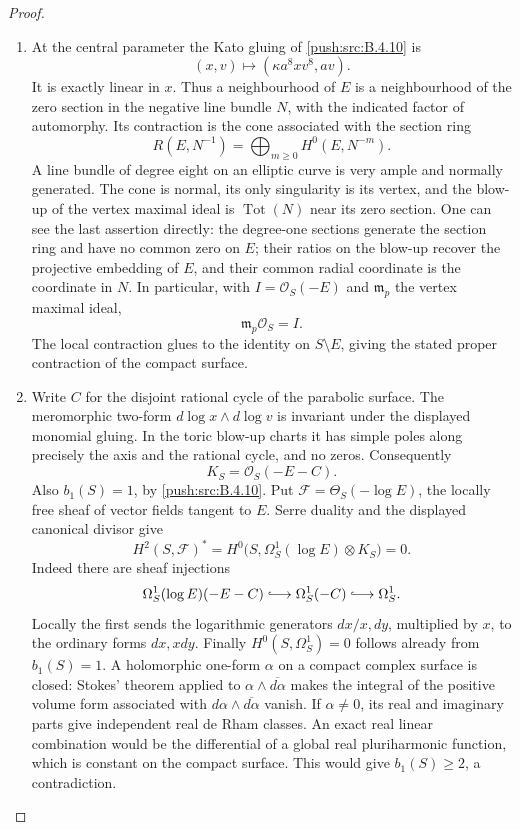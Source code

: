 \begin{proof}
\begin{enumerate}[label=\arabic*.,leftmargin=*]
\item At the central parameter the Kato gluing of \ref{push:src:B.4.10} is
\[
 (x,v)\longmapsto(\kappa a^8xv^8,av).
\]
It is exactly linear in $x$.  Thus a neighbourhood of $E$ is a
neighbourhood of the zero section in the negative line bundle
$N$, with the indicated factor of automorphy.
Its contraction is the cone associated with the section ring
\[
 R(E,N^{-1})=\bigoplus_{m\ge0}H^0(E,N^{-m}).
\]
A line bundle of degree eight on an elliptic curve is very ample
and normally generated.  The cone is normal, its only singularity
is its vertex, and the blow-up of the vertex maximal ideal is
$\operatorname{Tot}(N)$ near its zero section.
One can see the last assertion directly: the degree-one sections
generate the section ring and have no common zero on $E$;
their ratios on the blow-up recover the projective embedding of
$E$, and their common radial coordinate is the coordinate in $N$.
In particular, with $I=\mathcal O_S(-E)$ and $\mathfrak m_p$ the
vertex maximal ideal,
\[
 \mathfrak m_p\mathcal O_S=I.
\]
The local contraction glues to the identity on $S\setminus E$,
giving the stated proper contraction of the compact surface.

\item Write $C$ for the disjoint rational cycle of the parabolic surface.
The meromorphic two-form
$d\log x\wedge d\log v$ is invariant under the displayed
monomial gluing.  In the toric blow-up charts it has simple poles
along precisely the axis and the rational cycle, and no zeros.
Consequently
\[
 K_S=\mathcal O_S(-E-C).
\]
Also $b_1(S)=1$, by \ref{push:src:B.4.10}.
Put $\mathcal F=\Theta_S(-\log E)$, the locally free sheaf of
vector fields tangent to $E$.
Serre duality and the displayed canonical divisor give
\[
 H^2(S,\mathcal F)^*
 =H^0\bigl(S,\Omega^1_S(\log E)\otimes K_S\bigr)=0.
\]
Indeed there are sheaf injections
\[
 \Omega^1_S(\log E)(-E-C)
       \lhook\joinrel\longrightarrow\Omega^1_S(-C)
       \lhook\joinrel\longrightarrow\Omega^1_S.
\]
Locally the first sends the logarithmic generators
$dx/x,dy$, multiplied by $x$, to the ordinary forms $dx,xdy$.
Finally $H^0(S,\Omega^1_S)=0$ follows already from $b_1(S)=1$.
A holomorphic one-form $\alpha$ on a compact
complex surface is closed: Stokes' theorem applied to
$\alpha\wedge\overline{d\alpha}$ makes the integral of the
positive volume form associated with
$d\alpha\wedge\overline{d\alpha}$ vanish.
If $\alpha\ne0$, its real and imaginary parts give independent
real de Rham classes.  An exact real linear combination would
be the differential of a global real pluriharmonic function,
which is constant on the compact surface.  This would give
$b_1(S)\ge2$, a contradiction.


\end{enumerate}
\end{proof}
